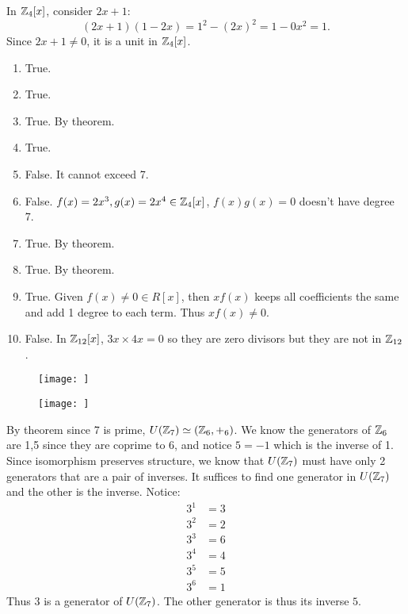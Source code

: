 \documentclass[class=article,crop=false]{standalone}
\begin{document}
\begin{problem}[22.22]
	In $ \mathbb{Z}_4[x]$, consider $ 2x+1$:
	 \[
		 (2x+1)(1-2x) = 1^2 - (2x)^2 = 1- 0x^2 = 1
	.\] 
	Since $ 2x+1\neq 0$, it is a unit in  $ \mathbb{Z}_4[x]$. 
\end{problem}

\begin{problem}[22.23]
\begin{enumerate}[label=\alph*)]
	\item True.
	\item True.
	\item True. By theorem.
	\item True.
	\item False. It cannot exceed 7.
	\item False. $ f(x)=2x^{3}, g(x)=2 x^{4} \in \mathbb{Z}_4[x]$, $ f(x)g(x) = 0$ doesn't have degree 7.  
	\item True. By theorem.
	\item True. By theorem.
	\item True. Given $ f(x)\neq 0 \in R[x]$, then $ xf(x)$ keeps all coefficients the same and add 1 degree to each term. Thus  $ xf(x) \neq 0$.
	\item False. In  $ \mathbb{Z}_{12}[x]$, $ 3x \times 4x = 0$ so they are zero divisors but they are not in $ \mathbb{Z}_{12}$. 
\end{enumerate}
\end{problem}

\begin{problem}[23.1]
\begin{figure}[H]
	\centering
	\texttt{[image: ]}
	\caption{}
\end{figure}
\end{problem}

\begin{problem}[23.2]
	\begin{figure}[H]
		\centering
		\texttt{[image: ]}
		\caption{}
	\end{figure}
\end{problem}

\begin{problem}[23.6]
	By theorem since 7 is prime, $ U(\mathbb{Z}_7) \simeq (\mathbb{Z}_6,+_{ 6} )$. We know the generators of $ \mathbb{Z}_6$ are 1,5 since they are coprime to 6, and notice $ 5 = -1$ which is the inverse of 1. Since isomorphism preserves structure, we know that  $ U(\mathbb{Z}_7)$ must have only 2 generators that are a pair of inverses. It suffices to find one generator in $ U(\mathbb{Z}_7)$ and the other is the inverse. Notice:
	\begin{align*}
		3^{1}&= 3 \\
		3^2 &= 2 \\
		3^{3} &= 6 \\
		3^{4} &= 4 \\
		3^{5} &= 5 \\
		3^{6} &= 1 
	\end{align*}
	Thus $ 3$ is a generator of  $ U(\mathbb{Z}_7)$. The other generator is thus its inverse $ 5$.
\end{problem}
\end{document}
